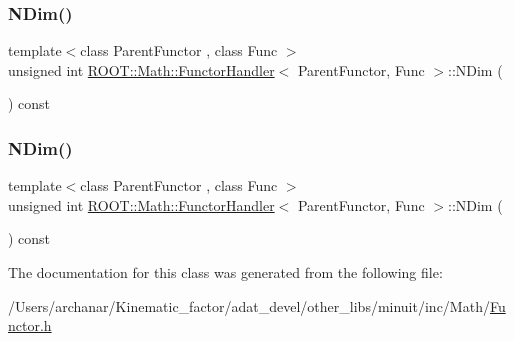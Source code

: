 \subsubsection{\texorpdfstring{NDim()}{NDim()}\hspace{0.1cm}{\footnotesize\ttfamily [1/2]}}
{\footnotesize\ttfamily template$<$class Parent\+Functor , class Func $>$ \\
unsigned int \mbox{\hyperlink{classROOT_1_1Math_1_1FunctorHandler}{R\+O\+O\+T\+::\+Math\+::\+Functor\+Handler}}$<$ Parent\+Functor, Func $>$\+::N\+Dim (\begin{DoxyParamCaption}{ }\end{DoxyParamCaption}) const\hspace{0.3cm}{\ttfamily [inline]}}

\mbox{\label{classROOT_1_1Math_1_1FunctorHandler_a448b3a68a8b9a55489a0b33b4cb26c93}} 
\subsubsection{\texorpdfstring{NDim()}{NDim()}\hspace{0.1cm}{\footnotesize\ttfamily [2/2]}}
{\footnotesize\ttfamily template$<$class Parent\+Functor , class Func $>$ \\
unsigned int \mbox{\hyperlink{classROOT_1_1Math_1_1FunctorHandler}{R\+O\+O\+T\+::\+Math\+::\+Functor\+Handler}}$<$ Parent\+Functor, Func $>$\+::N\+Dim (\begin{DoxyParamCaption}{ }\end{DoxyParamCaption}) const\hspace{0.3cm}{\ttfamily [inline]}}



The documentation for this class was generated from the following file\+:\begin{DoxyCompactItemize}
\item 
/\+Users/archanar/\+Kinematic\+\_\+factor/adat\+\_\+devel/other\+\_\+libs/minuit/inc/\+Math/\mbox{\hyperlink{other__libs_2minuit_2inc_2Math_2Functor_8h}{Functor.\+h}}\end{DoxyCompactItemize}
